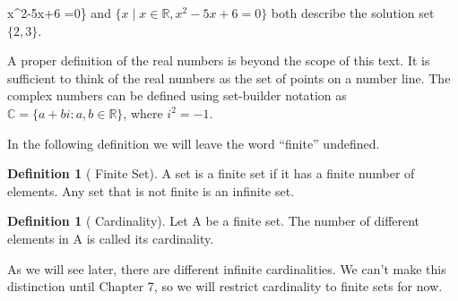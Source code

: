 \documentclass[10pt,]{book}
\theoremstyle{plain}
\theoremstyle{definition}
\newtheorem{definition}[theorem]{Definition}
\theoremstyle{definition}
\theoremstyle{definition}
\theoremstyle{definition}
\begin{document}
 \mid x^{2}-5x+6 =0\}\) and \(\{x \mid x \in \mathbb{R}, x^{2}-5x+6=0\}\) both describe the solution set \(\{2, 3\}\). 
%
\par
A proper definition of the real numbers is beyond the scope of this text. It is sufficient to think of the real numbers as the set of points on a
number line. The complex numbers can be defined using set-builder notation as \(\mathbb{C} = \{a + b i:a, b \in \mathbb{R}\}\), where \(i^2 = -1\).  %
\par
In the following definition we will leave the word ``finite'' undefined.   
%
\begin{definition}[ Finite Set]\label{finite-set}
A set is a finite set if it has a finite number of elements. Any set that is not finite is an infinite set.%
\end{definition}
\begin{definition}[ Cardinality]\label{cardinality.}
\label{notation-3}
Let A be a finite set. The number of different elements in A is called its cardinality.%
\end{definition}
\par
As we will see later, there are different infinite cardinalities. We can't make this distinction until Chapter 7, so we will restrict cardinality to finite sets for now.%
\typeout{************************************************}
\typeout{************************************************}
\end{document}
